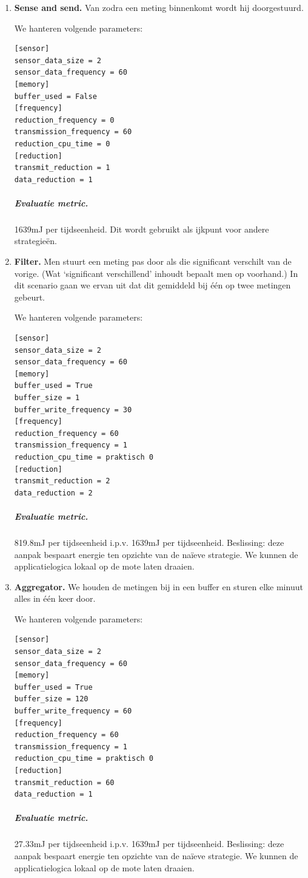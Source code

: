 \documentclass[11pt]{article}
\begin{document}
\begin{enumerate}
\item \textbf{Sense and send.} Van zodra een meting binnenkomt wordt hij doorgestuurd.

We hanteren volgende parameters: 

\begin{verbatim}
[sensor]
sensor_data_size = 2
sensor_data_frequency = 60
[memory]
buffer_used = False
[frequency]
reduction_frequency = 0
transmission_frequency = 60
reduction_cpu_time = 0
[reduction]
transmit_reduction = 1
data_reduction = 1
\end{verbatim}

\subparagraph{Evaluatie metric.} 1639mJ per tijdseenheid. Dit wordt gebruikt als ijkpunt voor andere strategie\"en.

\item \textbf{Filter.} Men stuurt een meting pas door als die significant verschilt
van de vorige. (Wat `significant verschillend' inhoudt bepaalt men op voorhand.)
In dit scenario gaan we ervan uit dat dit gemiddeld bij \'e\'en op twee metingen
gebeurt.

We hanteren volgende parameters:
\begin{verbatim}
[sensor]
sensor_data_size = 2
sensor_data_frequency = 60
[memory]
buffer_used = True
buffer_size = 1
buffer_write_frequency = 30
[frequency]
reduction_frequency = 60
transmission_frequency = 1
reduction_cpu_time = praktisch 0
[reduction]
transmit_reduction = 2
data_reduction = 2
\end{verbatim} 
\subparagraph{Evaluatie metric.} 819.8mJ per tijdseenheid i.p.v.
1639mJ per tijdseenheid. Beslissing: deze aanpak bespaart energie ten opzichte
van de na\"ieve strategie. We kunnen de applicatielogica lokaal op de mote laten
draaien.

\item \textbf{Aggregator.} We houden de metingen bij in een buffer en sturen elke
minuut alles in \'e\'en keer door.

We hanteren volgende parameters:
\begin{verbatim}
[sensor]
sensor_data_size = 2
sensor_data_frequency = 60
[memory]
buffer_used = True
buffer_size = 120
buffer_write_frequency = 60
[frequency]
reduction_frequency = 60
transmission_frequency = 1
reduction_cpu_time = praktisch 0
[reduction]
transmit_reduction = 60
data_reduction = 1
\end{verbatim}
\subparagraph{Evaluatie metric.} 27.33mJ per tijdseenheid i.p.v. 1639mJ per
tijdseenheid. Beslissing: deze aanpak bespaart energie ten opzichte van de na\"ieve strategie. We kunnen de applicatielogica lokaal op de mote laten draaien.


\end{enumerate}
\end{document}
